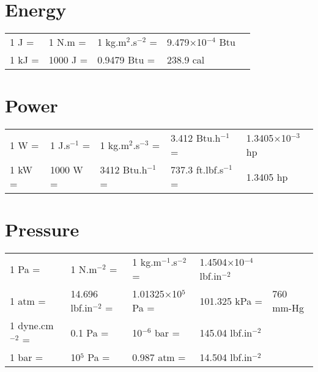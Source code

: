      
\section{Energy}\label{Chapter:UnitConversion:Section:Energy}
     \begin{center}
     \begin{tabular}{|l l l l l|}
       \hline
       1 J =& 1 N.m  =& 1 kg.m$^{2}$.s$^{-2}$ =& 9.479$\times$10$^{-4}$ Btu &  \\
       1 kJ =&  1000 J  =&  0.9479 Btu  =& 238.9 cal &                      \\
       \hline           
     \end{tabular}
     \end{center}
     
\section{Power}\label{Chapter:UnitConversion:Section:Power}
     \begin{center}
     \begin{tabular}{|l l l l l|}
       \hline
       1 W =& 1 J.s$^{-1}$  =& 1 kg.m$^{2}$.s$^{-3}$ =& 3.412 Btu.h$^{-1}$ =& 1.3405$\times$10$^{-3}$ hp   \\
       1 kW =&  1000 W  =& 3412 Btu.h$^{-1}$  =& 737.3 ft.lbf.s$^{-1}$ =& 1.3405 hp  \\
       \hline           
     \end{tabular}
     \end{center}
     
\section{Pressure}\label{Chapter:UnitConversion:Section:Pressure}
     \begin{center}
     \begin{tabular}{|l l l l l|}
       \hline
       1 Pa =& 1 N.m$^{-2}$ =& 1 kg.m$^{-1}$.s$^{-2}$ =& 1.4504$\times$10$^{-4}$ lbf.in$^{-2}$ & \\
       1 atm =& 14.696 lbf.in$^{-2}$ =& 1.01325$\times$10$^{5}$ Pa =& 101.325 kPa =& 760 mm-Hg \\
       1 dyne.cm$^{-2}$ =& 0.1 Pa =& 10$^{-6}$ bar =& 145.04 lbf.in$^{-2}$ & \\
       1 bar =& 10$^{5}$ Pa =& 0.987 atm =& 14.504 lbf.in$^{-2}$ & \\
       \hline           
     \end{tabular}
     \end{center}
     
